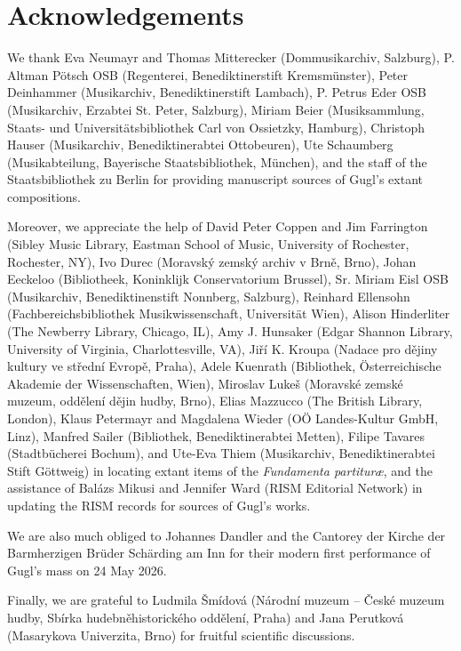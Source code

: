 \documentclass[abbrwidth=7em,shorttitlesize=55]{ees}
\begin{document}
\section{Acknowledgements}

We thank
Eva Neumayr and Thomas Mitterecker (Dommusikarchiv, Salzburg),
P. Altman Pötsch OSB (Regenterei, Benediktinerstift Kremsmünster),
Peter Deinhammer (Musikarchiv, Benediktinerstift Lambach),
P. Petrus Eder OSB (Musikarchiv, Erzabtei St. Peter, Salzburg),
Miriam Beier (Musiksammlung, Staats- und Universitätsbibliothek Carl von Ossietzky, Hamburg),
Christoph Hauser (Musikarchiv, Benediktinerabtei Ottobeuren),
Ute Schaumberg (Musikabteilung, Bayerische Staatsbibliothek, München), and
the staff of the Staatsbibliothek zu Berlin
for providing manuscript sources of Gugl’s extant compositions.

Moreover, we appreciate the help of
David Peter Coppen and Jim Farrington (Sibley Music Library, Eastman School of Music, University of Rochester, Rochester, NY),
Ivo Durec (Moravský zemský archiv v Brně, Brno),
Johan Eeckeloo (Bibliotheek, Koninklijk Conservatorium Brussel),
Sr. Miriam Eisl OSB (Musikarchiv, Benediktinenstift Nonnberg, Salzburg),
Reinhard Ellensohn (Fachbereichsbibliothek Musikwissenschaft, Universität Wien),
Alison Hinderliter (The Newberry Library, Chicago, IL),
Amy J. Hunsaker (Edgar Shannon Library, University of Virginia, Charlottesville, VA),
Jiří K. Kroupa (Nadace pro dějiny kultury ve střední Evropě, Praha),
Adele Kuenrath (Bibliothek, Österreichische Akademie der Wissenschaften, Wien),
Miroslav Lukeš (Moravské zemské muzeum, oddělení dějin hudby, Brno),
Elias Mazzucco (The British Library, London),
Klaus Petermayr and Magdalena Wieder (OÖ Landes-Kultur GmbH, Linz),
Manfred Sailer (Bibliothek, Benediktinerabtei Metten),
Filipe Tavares (Stadtbücherei Bochum), and
Ute-Eva Thiem (Musikarchiv, Benediktinerabtei Stift Göttweig)
in locating extant items of the \textit{Fundamenta partituræ},
and the assistance of Balázs Mikusi and Jennifer Ward (RISM Editorial Network) in updating the RISM records for sources of Gugl's works.

We are also much obliged to Johannes Dandler and the Cantorey der Kirche der Barmherzigen Brüder Schärding am Inn for their modern first performance of Gugl’s mass on 24 May 2026.

Finally, we are grateful to
Ludmila Šmídová (Národní muzeum – České muzeum hudby, Sbírka hudebněhistorického oddělení, Praha) and
Jana Perutková (Masarykova Univerzita, Brno)
for fruitful scientific discussions.
\end{document}
